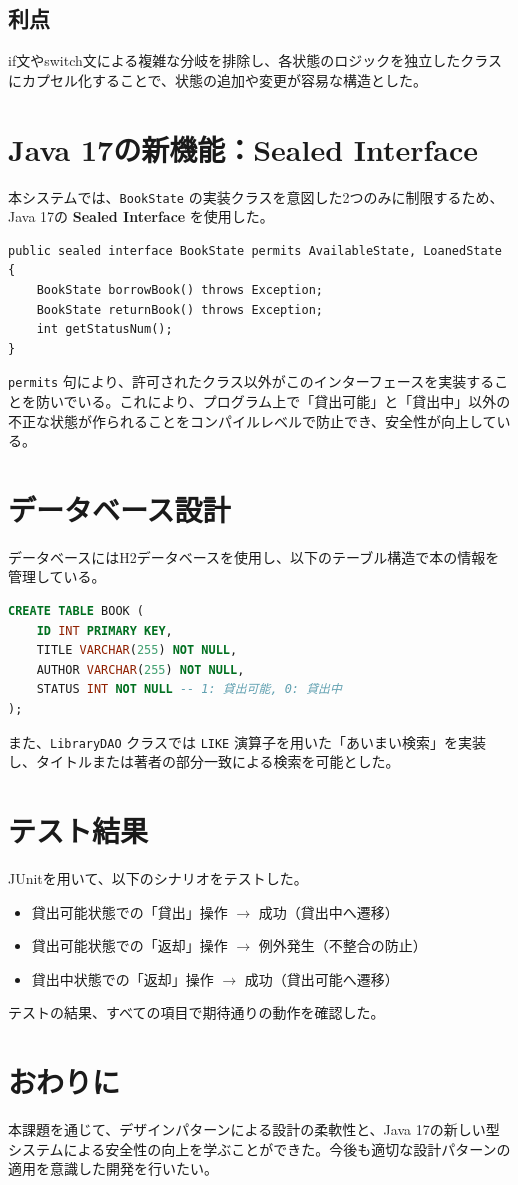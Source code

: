 \documentclass[a4paper,11pt]{ltjsarticle}
\begin{document}
\subsection{利点}
if文やswitch文による複雑な分岐を排除し、各状態のロジックを独立したクラスにカプセル化することで、状態の追加や変更が容易な構造とした。

\section{Java 17の新機能：Sealed Interface}
本システムでは、\texttt{BookState} の実装クラスを意図した2つのみに制限するため、Java 17の \textbf{Sealed Interface} を使用した。

\begin{lstlisting}[caption=Sealed Interfaceの実装例]
public sealed interface BookState permits AvailableState, LoanedState {
    BookState borrowBook() throws Exception;
    BookState returnBook() throws Exception;
    int getStatusNum();
}
\end{lstlisting}

\texttt{permits} 句により、許可されたクラス以外がこのインターフェースを実装することを防いでいる。これにより、プログラム上で「貸出可能」と「貸出中」以外の不正な状態が作られることをコンパイルレベルで防止でき、安全性が向上している。

\section{データベース設計}
データベースにはH2データベースを使用し、以下のテーブル構造で本の情報を管理している。

\begin{lstlisting}[caption=テーブル作成SQL (schema.sql), language=SQL]
CREATE TABLE BOOK (
    ID INT PRIMARY KEY,
    TITLE VARCHAR(255) NOT NULL,
    AUTHOR VARCHAR(255) NOT NULL,
    STATUS INT NOT NULL -- 1: 貸出可能, 0: 貸出中
);
\end{lstlisting}

また、\texttt{LibraryDAO} クラスでは \texttt{LIKE} 演算子を用いた「あいまい検索」を実装し、タイトルまたは著者の部分一致による検索を可能とした。

\section{テスト結果}
JUnitを用いて、以下のシナリオをテストした。
\begin{itemize}
    \item 貸出可能状態での「貸出」操作 $\rightarrow$ 成功（貸出中へ遷移）
    \item 貸出可能状態での「返却」操作 $\rightarrow$ 例外発生（不整合の防止）
    \item 貸出中状態での「返却」操作 $\rightarrow$ 成功（貸出可能へ遷移）
\end{itemize}
テストの結果、すべての項目で期待通りの動作を確認した。

\section{おわりに}
本課題を通じて、デザインパターンによる設計の柔軟性と、Java 17の新しい型システムによる安全性の向上を学ぶことができた。今後も適切な設計パターンの適用を意識した開発を行いたい。
\end{document}
